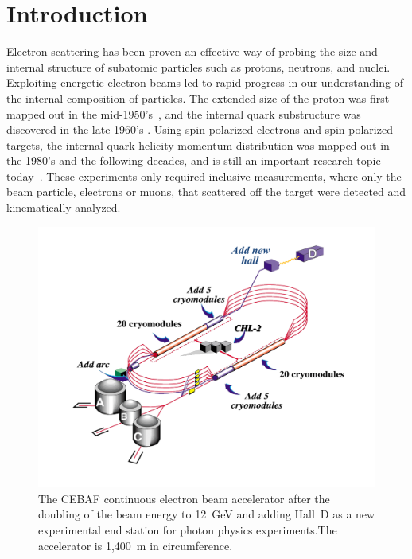 \documentclass[final,3p,twocolumn]{elsarticle}
\begin{document}
\nolinenumbers
\section{Introduction}

Electron scattering has been proven an effective way of probing the size and internal structure of subatomic
particles such as protons, neutrons, and nuclei. Exploiting energetic electron beams led to rapid progress in our
understanding of the internal composition of particles. The extended size of the proton was first mapped out in
the mid-1950's~\cite{Mcallister:1956ng}, and the internal quark substructure was discovered in the late 1960's
\cite{Breidenbach:1969kd}. Using spin-polarized electrons and spin-polarized targets, the internal quark helicity
momentum distribution was mapped out in the 1980's and the following decades, and is still an important research
topic today~\cite{Kuhn:2008sy}. These experiments only required inclusive measurements, where only the beam
particle, electrons or muons, that scattered off the target were detected and kinematically analyzed.  

\begin{figure}[ht]
\centerline{\includegraphics[width=1.0\columnwidth]{cebaf.pdf}}
\caption{The CEBAF continuous electron beam accelerator after the doubling of the beam energy to 12~GeV and 
adding Hall~D as a new experimental end station for photon physics experiments.The accelerator is 1,400~m in
circumference.}
\label{cebaf12}
\end{figure} 
\end{document}
